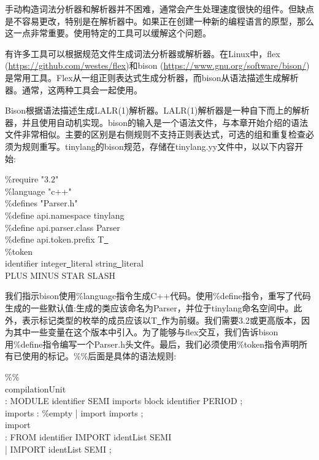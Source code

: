 手动构造词法分析器和解析器并不困难，通常会产生处理速度很快的组件。但缺点是不容易更改，特别是在解析器中。如果正在创建一种新的编程语言的原型，那么这一点非常重要。使用特定的工具可以缓解这个问题。\par

有许多工具可以根据规范文件生成词法分析器或解析器。在Linux中，flex (\url{https://github.com/westes/flex})和bison (\url{https://www.gnu.org/software/bison/})是常用工具。Flex从一组正则表达式生成分析器，而bison从语法描述生成解析器。通常，这两种工具会一起使用。\par

Bison根据语法描述生成LALR(1)解析器。LALR(1)解析器是一种自下而上的解析器，并且使用自动机实现。bison的输入是一个语法文件，与本章开始介绍的语法文件非常相似。主要的区别是右侧规则不支持正则表达式，可选的组和重复检查必须为规则重写。tinylang的bison规范，存储在tinylang.yy文件中，以以下内容开始:\par

\begin{tcolorbox}[colback=white,colframe=black]
\%require "3.2" \\
\%language "c++" \\
\%defines "Parser.h" \\
\%define api.namespace {tinylang} \\
\%define api.parser.class {Parser} \\
\%define api.token.prefix {T\underline{~}} \\
\%token \\
identifier integer\underline{~}literal string\underline{~}literal \\
PLUS MINUS STAR SLASH
\end{tcolorbox}

我们指示bison使用\%language指令生成C++代码。使用\%define指令，重写了代码生成的一些默认值:生成的类应该命名为Parser，并位于tinylang命名空间中。此外，表示标记类型的枚举的成员应该以T\underline{~}作为前缀。我们需要3.2或更高版本，因为其中一些变量在这个版本中引入。为了能够与flex交互，我们告诉bison用\%define指令编写一个Parser.h头文件。最后，我们必须使用\%token指令声明所有已使用的标记。\%\%后面是具体的语法规则:\par

\begin{tcolorbox}[colback=white,colframe=black]
\%\% \\
compilationUnit \\
\hspace*{0.5cm}: MODULE identifier SEMI imports block identifier PERIOD ; \\
imports : \%empty | import imports ; \\
import \\
\hspace*{0.5cm}: FROM identifier IMPORT identList SEMI \\
\hspace*{0.5cm}| IMPORT identList SEMI ;
\end{tcolorbox}

